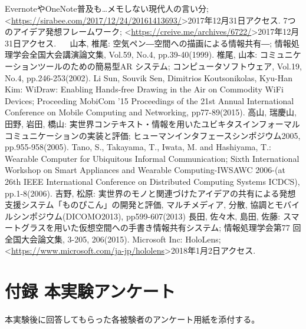 \documentclass[11pt,a4j, titlepage]{jarticle} %
\begin{document}
\newpage
\begin{thebibliography}{数字}
   EvernoteやOneNote普及も…メモしない現代人の言い分; \textless\url{https://sirabee.com/2017/12/24/20161413693/}\textgreater2017年12月31日アクセス.
   7つのアイデア発想フレームワーク; \textless\url{https://creive.me/archives/6722/}\textgreater2017年12月31日アクセス.
　 山本, 椎尾: 空気ペン―空間への描画による情報共有―; 情報処理学会全国大会講演論文集, Vol.59, No.4,
pp.39-40(1999).
   椎尾, 山本: コミュニケーションツールのための簡易型AR システム; コンピュータソフトウェア, Vol.19,
No.4, pp.246-253(2002).
   Li Sun, Souvik Sen, Dimitrios Koutsonikolas, Kyu-Han Kim: WiDraw: Enabling Hands-free Drawing in the Air on Commodity WiFi Devices; Proceeding MobiCom '15 Proceedings of the 21st Annual International Conference on Mobile Computing and Networking, pp77-89(2015).
   高山, 瑞慶山, 田野, 岩田, 橋山: 実世界コンテキスト・情報を用いたユビキタスインフォーマルコミュニケーションの実装と評価; ヒューマンインタフェースシンポジウム2005, pp.955-958(2005).
   Tano, S., Takayama, T., Iwata, M. and Hashiyama, T.: Wearable Computer for Ubiquitous Informal Communication; Sixth International Workshop on Smart Appliances and Wearable Computing-IWSAWC 2006-(at 26th IEEE International Conference on Distributed Computing Systems
ICDCS), pp.1-8(2006).
   吉野, 松原: 実世界のモノと関連づけたアイデアの共有による発想支援システム「ものぴこん」の開発と評価, マルチメディア, 分散, 協調とモバイルシンポジウム(DICOMO2013), pp599-607(2013)
   長田, 佐々木, 島田, 佐藤: スマートグラスを用いた仮想空間への手書き情報共有システム; 情報処理学会第77 回全国大会論文集, 3-205, 206(2015).
   Microsoft Inc: HoloLens; \textless\url{https://www.microsoft.com/ja-jp/hololens}\textgreater2018年1月2日アクセス.
\end{thebibliography}

\newpage
\section*{付録 本実験アンケート}
本実験後に回答してもらった各被験者のアンケート用紙を添付する。
\end{document}
